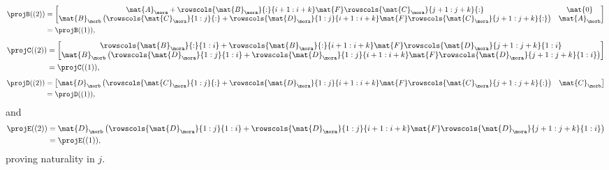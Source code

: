 {\begin{example}
\begin{equation*}
            \begin{aligned}
                \projB((2)) & =\begin{bmatrix}
                                   \mat{A}_\mora + \rowscols{\mat{B}_\mora}{:}{i+1:i+k}\mat{F}\rowscols{\mat{C}_\mora}{j+1:j+k}{:}                                                   & \mat{0}       \\
                                   \mat{B}_\morb \left( \rowscols{\mat{C}_\mora}{1:j}{:}+ \rowscols{\mat{D}_\mora}{1:j}{i+1:i+k} \mat{F} \rowscols{\mat{C}_\mora}{j+1:j+k}{:}\right) & \mat{A}_\morb
                               \end{bmatrix} \\
                            & =\projB((1)),
            \end{aligned}
        \end{equation*}
        \begin{equation*}
            \begin{aligned}
                \projC((2)) & =\begin{bmatrix} \rowscols{\mat{B}_\mora}{:}{1:i}+\rowscols{\mat{B}_\mora}{:}{i+1:i+k}\mat{F}\rowscols{\mat{D}_\mora}{j+1:j+k}{1:i} \\ \mat{B}_\morb \left( \rowscols{\mat{D}_\mora}{1:j}{1:i}+ \rowscols{\mat{D}_\mora}{1:j}{i+1:i+k}\mat{F}\rowscols{\mat{D}_\mora}{j+1:j+k}{1:i}\right)\end{bmatrix} \\
                            & =\projC((1)),
            \end{aligned}
        \end{equation*}
        \begin{equation*}
            \begin{aligned}
                \projD((2)) & =\begin{bmatrix}\mat{D}_\morb \left(\rowscols{\mat{C}_\mora}{1:j}{:}+ \rowscols{\mat{D}_\mora}{1:j}{i+1:i+k} \mat{F} \rowscols{\mat{C}_\mora}{j+1:j+k}{:}\right)&\mat{C}_\morb \end{bmatrix} \\
                            & =\projD((1)),
            \end{aligned}
        \end{equation*}
        and
        \begin{equation*}
            \begin{aligned}
                \projE((2)) & =\mat{D}_\morb\left(\rowscols{\mat{D}_\mora}{1:j}{1:i}+ \rowscols{\mat{D}_\mora}{1:j}{i+1:i+k}\mat{F}\rowscols{\mat{D}_\mora}{j+1:j+k}{1:i} \right) \\
                            & =\projE((1)),
            \end{aligned}
        \end{equation*}
        proving naturality in $j$.

\end{example}}
